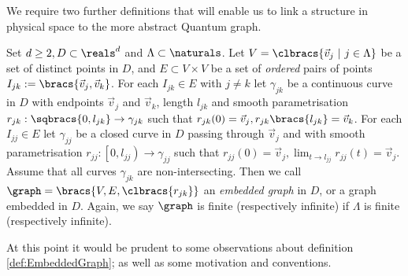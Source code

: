 We require two further definitions that will enable us to link a structure in physical space to the more abstract Quantum graph.
\begin{definition} \label{def:EmbeddedGraph}
	Set $d\geq2, D\subset\reals^d$ and $\Lambda\subset\naturals$.
	Let $V = \clbracs{\vec{v}_j \ \vert \ j\in\Lambda}$ be a set of distinct points in $D$, and $E\subset V\times V$ be a set of \textit{ordered} pairs of points $I_{jk} := \bracs{\vec{v}_j, \vec{v}_k}$.
	For each $I_{jk}\in E$ with $j\neq k$ let $\gamma_{jk}$ be a continuous curve in $D$ with endpoints $\vec{v}_j$ and $\vec{v}_k$, length $l_{jk}$ and smooth parametrisation $r_{jk}:\sqbracs{0,l_{jk}}\rightarrow\gamma_{jk}$ such that $r_{jk}(0) = \vec{v}_j, r_{jk}\bracs{l_{jk}} = \vec{v}_k$.
	For each $I_{jj}\in E$ let $\gamma_{jj}$ be a closed curve in $D$ passing through $\vec{v}_j$ and with smooth parametrisation $r_{jj}:\left[0,l_{jj}\right)\rightarrow\gamma_{jj}$ such that $r_{jj}(0) = \vec{v}_{j}, \lim_{t\rightarrow l_{jj}}r_{jj}(t) = \vec{v}_j$.
	Assume that all curves $\gamma_{jk}$ are non-intersecting.
	Then we call $\graph=\bracs{V, E, \clbracs{r_{jk}}}$ an \textit{embedded graph} in $D$, or a graph embedded in $D$. \newline
	Again, we say $\graph$ is finite (respectively infinite) if $\Lambda$ is finite (respectively infinite).
\end{definition}
At this point it would be prudent to some observations about definition \ref{def:EmbeddedGraph}; as well as some motivation and conventions.
